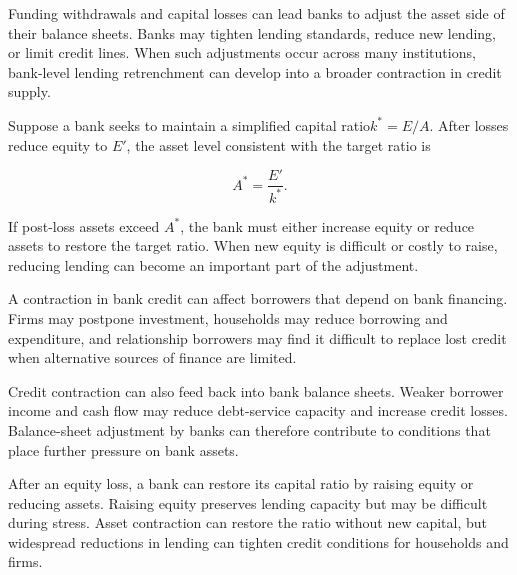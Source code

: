 Funding withdrawals and capital losses can lead banks to adjust the asset side of their balance sheets. Banks may tighten lending standards, reduce new lending, or limit credit lines. When such adjustments occur across many institutions, bank-level lending retrenchment can develop into a broader contraction in credit supply.

Suppose a bank seeks to maintain a simplified capital ratio$
k^{*}=E/A$.
After losses reduce equity to \(E'\), the asset level consistent with the target ratio is

\begin{equation}
A^{*}
=
\frac{E'}{k^{*}}.
\label{eq:ch21-capital-constrained-assets}
\end{equation}

If post-loss assets exceed \(A^{*}\), the bank must either increase equity or reduce assets to restore the target ratio. When new equity is difficult or costly to raise, reducing lending can become an important part of the adjustment.

A contraction in bank credit can affect borrowers that depend on bank financing. Firms may postpone investment, households may reduce borrowing and expenditure, and relationship borrowers may find it difficult to replace lost credit when alternative sources of finance are limited.

Credit contraction can also feed back into bank balance sheets. Weaker borrower income and cash flow may reduce debt-service capacity and increase credit losses. Balance-sheet adjustment by banks can therefore contribute to conditions that place further pressure on bank assets.

\begin{tcolorbox}[
  enhanced,
  breakable,
  colback=white,
  colframe=FinanceBlue,
  boxrule=0.7pt,
  sharp corners,
  borderline west={2.2pt}{0pt}{FinanceBlue},
  title=\textbf{Financial Perspective: Two Routes to Restore a Capital Ratio},
  coltitle=white,
  colbacktitle=FinanceBlue,
  fonttitle=\bfseries,
  before skip=1.2em,
  after skip=1.2em
]

After an equity loss, a bank can restore its capital ratio by raising equity or reducing assets. Raising equity preserves lending capacity but may be difficult during stress. Asset contraction can restore the ratio without new capital, but widespread reductions in lending can tighten credit conditions for households and firms.

\end{tcolorbox}



